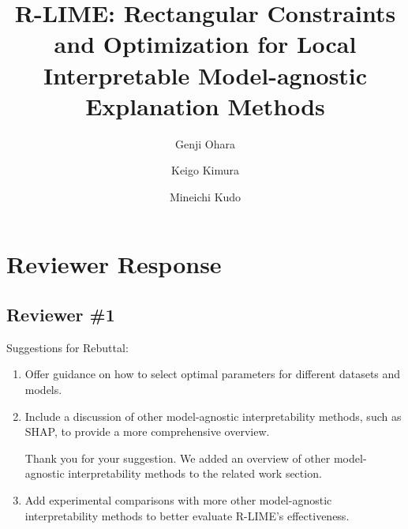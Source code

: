 \documentclass[runningheads]{llncs}
\begin{document}
\title{%
  R-LIME\@: Rectangular Constraints and Optimization for Local Interpretable
  Model-agnostic Explanation Methods
}


\author{Genji Ohara \and %
  Keigo Kimura \and      %
  Mineichi Kudo          %
}



\section*{Reviewer Response}
\subsection*{Reviewer \#1}
Suggestions for Rebuttal:
\begin{enumerate}
  \setlength{\itemsep}{15pt}
  \item Offer guidance on how to select optimal parameters for different
        datasets and models.
  \item Include a discussion of other model-agnostic interpretability methods,
        such as SHAP, to provide a more comprehensive overview.

        \vspace{10pt}
        \hspace{.02\textwidth}
        \begin{minipage}{.92\textwidth}%
          Thank you for your suggestion. We added an overview of other
          model-agnostic interpretability methods to the related work section.
        \end{minipage}

  \item Add experimental comparisons with more other model-agnostic \\
        interpretability methods to better evaluate R-LIME's effectiveness.
\end{enumerate}
\end{document}
